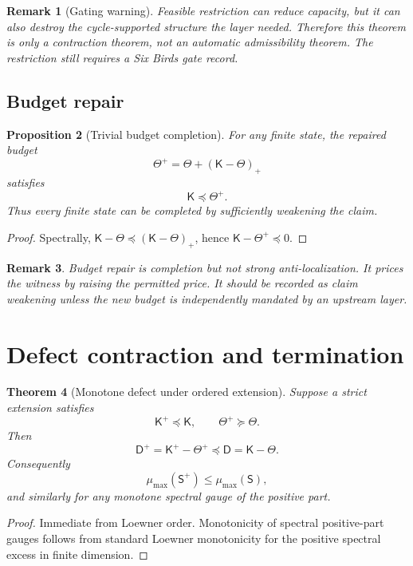 \documentclass[11pt]{article}
\newtheorem{theorem}{Theorem}[section]
\newtheorem{proposition}[theorem]{Proposition}
\newtheorem{remark}[theorem]{Remark}
\newcommand{\K}{\mathsf K}
\newcommand{\D}{\mathsf D}
\newcommand{\Sstate}{\mathsf S}
\begin{document}
\begin{remark}[Gating warning]
Feasible restriction can reduce capacity, but it can also destroy the cycle-supported structure the layer needed. Therefore this theorem is only a contraction theorem, not an automatic admissibility theorem. The restriction still requires a Six Birds gate record.
\end{remark}

\subsection{Budget repair}

\begin{proposition}[Trivial budget completion]
For any finite state, the repaired budget
\[
  \Theta^+=\Theta+(\K-\Theta)_+
\]
satisfies
\[
  \K\preceq\Theta^+.
\]
Thus every finite state can be completed by sufficiently weakening the claim.
\end{proposition}

\begin{proof}
Spectrally, $\K-\Theta\preceq(\K-\Theta)_+$, hence $\K-\Theta^+\preceq0$.
\end{proof}

\begin{remark}
Budget repair is completion but not strong anti-localization. It prices the witness by raising the permitted price. It should be recorded as claim weakening unless the new budget is independently mandated by an upstream layer.
\end{remark}

\section{Defect contraction and termination}

\begin{theorem}[Monotone defect under ordered extension]
Suppose a strict extension satisfies
\[
  \K^+\preceq\K,
  \qquad
  \Theta^+\succeq\Theta.
\]
Then
\[
  \D^+=\K^+-\Theta^+\preceq \D=\K-\Theta.
\]
Consequently
\[
  \mu_{\max}(\Sstate^+)\le\mu_{\max}(\Sstate),
\]
and similarly for any monotone spectral gauge of the positive part.
\end{theorem}

\begin{proof}
Immediate from Loewner order. Monotonicity of spectral positive-part gauges follows from standard Loewner monotonicity for the positive spectral excess in finite dimension.
\end{proof}
\end{document}
